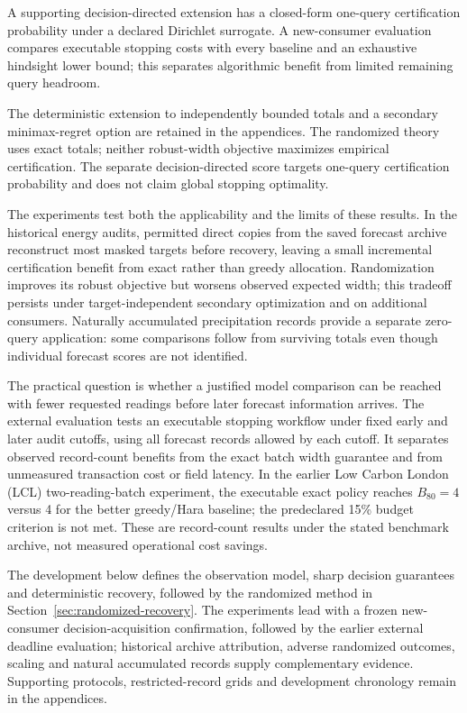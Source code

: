 \documentclass[12pt]{article}
\begin{document}
A supporting decision-directed extension has a closed-form one-query certification
probability under a declared Dirichlet surrogate. A new-consumer evaluation
compares executable stopping costs with every baseline and an exhaustive
hindsight lower bound; this separates algorithmic benefit from limited
remaining query headroom.

The deterministic extension to independently bounded totals and a secondary
minimax-regret option are retained in the appendices. The randomized theory
uses exact totals; neither robust-width objective maximizes empirical certification. The separate decision-directed score targets one-query certification probability and does not claim global stopping optimality.

The experiments test both the applicability and the limits of these results.
In the historical energy audits, permitted direct copies from the saved forecast archive
reconstruct most masked targets before recovery, leaving a small incremental
certification benefit from exact rather than greedy allocation. Randomization
improves its robust objective but worsens observed expected width; this
tradeoff persists under target-independent secondary optimization and on
additional consumers. Naturally accumulated precipitation records provide
a separate zero-query application: some comparisons follow from surviving
totals even though individual forecast scores are not identified.

The practical question is whether a justified model comparison can be reached
with fewer requested readings before later forecast information arrives.
The external evaluation tests an executable stopping workflow under fixed
early and later audit cutoffs, using all forecast records allowed by each
cutoff. It separates observed record-count benefits from the exact batch
width guarantee and from unmeasured transaction cost or field latency.
In the earlier Low Carbon London (LCL) two-reading-batch experiment, the executable exact policy reaches $B_{80}=4$ versus 4 for the better greedy/Hara baseline; the predeclared 15\% budget criterion is not met. These are record-count results under the stated benchmark archive, not measured operational cost savings.

The development below defines the observation model, sharp decision
guarantees and deterministic recovery, followed by the randomized method in
Section~\ref{sec:randomized-recovery}. The experiments lead with a frozen new-consumer
decision-acquisition confirmation, followed by the earlier external
deadline evaluation; historical archive attribution, adverse randomized
outcomes, scaling and natural accumulated records supply complementary
evidence. Supporting protocols, restricted-record grids and development
chronology remain in the appendices.
\end{document}

